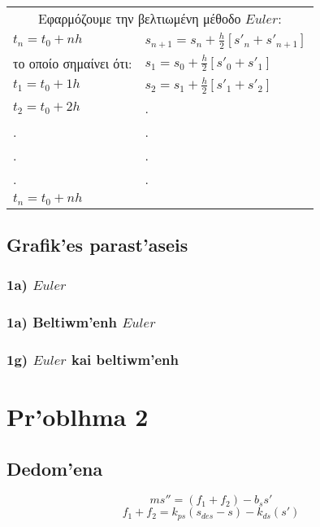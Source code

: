 \documentclass[a4paper]{article}
\begin{document}
        \vspace{70pt}

        \begin{tabular}{l|l}
            \multicolumn{2}{c}{Εφαρμόζουμε την βελτιωμένη μέθοδο $Euler$: }\\
            $t_n=t_0+nh$ & $s_{n+1}=s_n+\frac{h}{2}[s'_n+s'_{n+1}]$\\
            το οποίο σημαίνει ότι:& $s_1=s_0+\frac{h}{2}[s'_0+s'_1]$\\
            $t_1=t_0+1h$          &$s_2=s_1+\frac{h}{2}[s'_1+s'_2]$ \\
            $t_2=t_0+2h$          & .\\
            .                     & .\\
            .                     & .\\
            .                     & .\\
            $t_n=t_0+nh$          &  \\
        \end{tabular}

        \subsection{Grafik'es parast'aseis}
        \subsubsection*{1a) $Euler$}

        \subsubsection*{1a) Beltiwm'enh $Euler$}

        \subsubsection*{1g) $Euler$ kai beltiwm'enh}

        \section{Pr'oblhma 2}
        \subsection{Dedom'ena}
        \begin{equation}
            ms''=(f_1+f_2)-b_ss'
            \label{prob2:5}
        \end{equation}
        \begin{equation}
            f_1+f_2=k_{ps}(s_{des}-s)-k_{ds}(s')
            \label{prob2:6}
        \end{equation}
\end{document}

